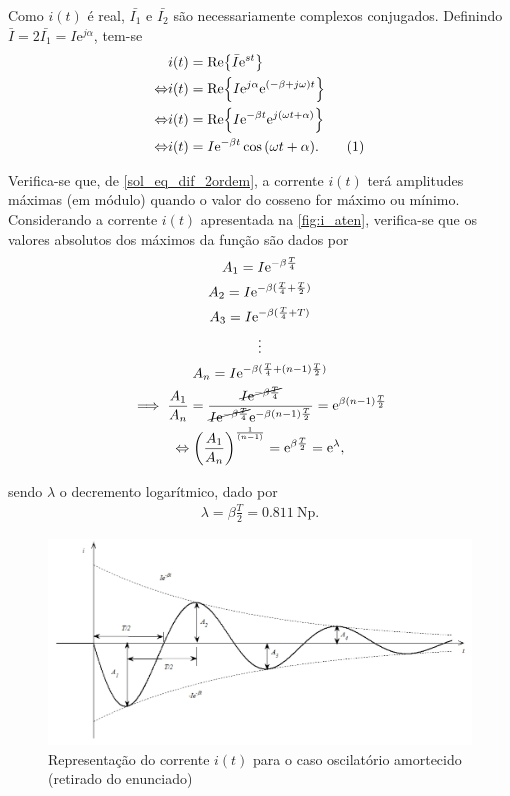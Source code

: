 \documentclass[a4paper, titlepage, portuguese]{article}
\newcommand{\eq}{\Leftrightarrow} %
\newcommand\numberthis{\addtocounter{equation}{1}\tag{\theequation}}
\newcommand\e{\mathrm{e} }
\begin{document}
		Como $i(t)$ é real, $\bar{I_{1}}$ e $\bar{I_{2}}$ são necessariamente complexos conjugados. Definindo $\bar{I} = 2\bar{I_1} = I\e^{j\alpha}$, tem-se
		\begin{align*}
			& i(t) = \Re{\bar{I}\e^{st}} \\ \eq
			& i(t) = \Re{I\e^{j\alpha}\e^{(-\beta + j\omega)t}} \\ \eq
			& i(t) = \Re{I\e^{-\beta t}\e^{j(\omega t + \alpha)}} \\ \eq
			& i(t) = I\e^{-\beta t} \cos{(\omega t + \alpha)}. \numberthis \label{sol_eq_dif_2ordem}
		\end{align*}

		Verifica-se que, de \eqref{sol_eq_dif_2ordem}, a corrente $i(t)$ terá amplitudes máximas (em módulo) quando o valor do cosseno for máximo ou mínimo. Considerando a corrente $i(t)$ apresentada na \autoref{fig:i_aten}, verifica-se que os valores absolutos dos máximos da função são dados por
		\begin{gather*}
			 A_1 = I\e^{-\beta \frac{T}{4}} \\
			 A_2 = I\e^{-\beta(\frac{T}{4} + \frac{T}{2})} \\
			 A_3 = I\e^{-\beta(\frac{T}{4} + T)}\\
			\vdots \\
			 A_n = I\e^{-\beta(\frac{T}{4} + (n-1)\frac{T}{2})} \\
			 \implies \frac{A_1}{A_n} = \frac{\cancel{I\e^{-\beta \frac{T}{4}}}}{\cancel{I\e^{-\beta\frac{T}{4}}} \e^{-\beta(n-1)\frac{T}{2}}} = \e^{\beta(n-1)\frac{T}{2}} \\ \eq
			 \left(\frac{A_1}{A_n}\right)^{\frac{1}{(n-1)}} = \e^{\beta\frac{T}{2}} = \e^\lambda,
		\end{gather*}

		sendo $\lambda$ o decremento logarítmico, dado por
		\begin{align*}
			 \lambda = \beta \frac{T}{2} = \SI{0.811}{\neper}.
		\end{align*}

		\begin{figure}[H]
			\centering
			\includegraphics[width=0.7\linewidth]{aten.png}
			\caption{Representação do corrente $i(t)$ para o caso oscilatório amortecido (retirado do enunciado)}
			\label{fig:i_aten}
		\end{figure}
\end{document}
